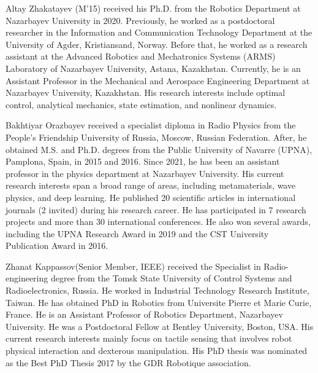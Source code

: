 \documentclass[lettersize,journal]{IEEEtran}
\begin{document}
\begin{IEEEbiography}
	{Altay Zhakatayev} (M'15) received his Ph.D. from the Robotics Department at Nazarbayev University in 2020. Previously, he worked as a postdoctoral researcher in the Information and Communication Technology Department at the University of Agder, Kristiansand, Norway. Before that, he worked as a research assistant at the Advanced Robotics and Mechatronics Systems (ARMS) Laboratory of Nazarbayev University, Astana, Kazakhstan. Currently, he is an Assistant Professor in the Mechanical and Aerospace Engineering Department at Nazarbayev University, Kazakhstan. His research interests include optimal control, analytical mechanics, state estimation, and nonlinear dynamics.
\end{IEEEbiography}

\begin{IEEEbiography}[{}] {Bakhtiyar Orazbayev} received a specialist diploma in Radio Physics from the People’s Friendship University of Russia, Moscow, Russian Federation. After, he obtained M.S. and Ph.D. degrees from the Public University of Navarre (UPNA), Pamplona, Spain, in 2015 and 2016. Since 2021, he has been an assistant professor in the physics department at Nazarbayev University. His current research interests span a broad range of areas, including metamaterials, wave physics, and deep learning. He published 20 scientific articles in international journals (2 invited) during his research career. He has participated in 7 research projects and more than 30 international conferences. He also won several awards, including the UPNA Research Award in 2019 and the CST University Publication Award in 2016.  \end{IEEEbiography}

\begin{IEEEbiography} {Zhanat Kappassov}(Senior Member, IEEE) received the Specialist in Radio-engineering degree from the Tomsk State University of Control Systems and Radioelectronics, Russia. He worked in Industrial Technology Research Institute, Taiwan. He has obtained PhD in Robotics from Universite Pierre et Marie
Curie, France.  He is an Assistant Professor
of Robotics Department, Nazarbayev University. He was a Postdoctoral Fellow at Bentley University, Boston, USA. His current research interests mainly focus on tactile sensing that involves
robot physical interaction and dexterous manipulation. His PhD thesis was nominated as the Best PhD Thesis 2017 by the GDR Robotique association.\end{IEEEbiography}
\vfill
\strut
{}
\end{document}

